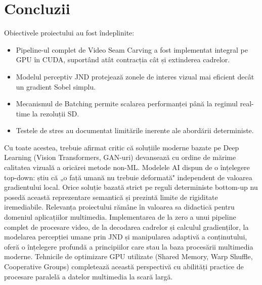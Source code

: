 \documentclass[12pt,a4paper]{article}
\begin{document}
\section{Concluzii}
Obiectivele proiectului au fost îndeplinite:
\begin{itemize}[noitemsep]
    \item Pipeline-ul complet de Video Seam Carving a fost implementat integral pe GPU în CUDA, suportând atât contracția cât și extinderea cadrelor.
    \item Modelul perceptiv JND protejează zonele de interes vizual mai eficient decât un gradient Sobel simplu.
    \item Mecanismul de Batching permite scalarea performanței până la regimul real-time la rezoluții SD.
    \item Testele de stres au documentat limitările inerente ale abordării deterministe.
\end{itemize}
Cu toate acestea, trebuie afirmat critic că soluțiile moderne bazate pe Deep Learning (Vision Transformers, GAN-uri) devansează cu ordine de mărime calitatea vizuală a oricărei metode non-ML. Modelele AI dispun de o înțelegere top-down: știu că „o față umană nu trebuie deformată" independent de valoarea gradientului local. Orice soluție bazată strict pe reguli deterministe bottom-up nu posedă această reprezentare semantică și prezintă limite de rigiditate iremediabile.
Relevanța proiectului rămâne în valoarea sa didactică pentru domeniul aplicațiilor multimedia. Implementarea de la zero a unui pipeline complet de procesare video, de la decodarea cadrelor și calculul gradienților, la modelarea percepției umane prin JND și manipularea adaptivă a conținutului, oferă o înțelegere profundă a principiilor care stau la baza procesării multimedia moderne. Tehnicile de optimizare GPU utilizate (Shared Memory, Warp Shuffle, Cooperative Groups) completează această perspectivă cu abilități practice de procesare paralelă a datelor multimedia la scară largă.
\end{document}
